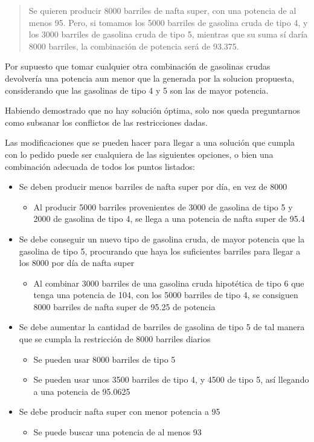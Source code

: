 \documentclass[
]{article}
\providecommand{\tightlist}{%
  \setlength{\itemsep}{0pt}\setlength{\parskip}{0pt}}
\begin{document}
\begin{quote}
Se quieren producir 8000 barriles de nafta super, con una potencia de al
menos 95. Pero, si tomamos los 5000 barriles de gasolina cruda de tipo
4, y los 3000 barriles de gasolina cruda de tipo 5, mientras que su suma
sí daría 8000 barriles, la combinación de potencia será de 93.375.
\end{quote}

Por supuesto que tomar cualquier otra combinación de gasolinas crudas
devolvería una potencia aun menor que la generada por la solucion
propuesta, considerando que las gasolinas de tipo 4 y 5 son las de mayor
potencia.

Habiendo demostrado que no hay solución óptima, solo nos queda
preguntarnos como subsanar los conflictos de las restricciones dadas.

Las modificaciones que se pueden hacer para llegar a una solución que
cumpla con lo pedido puede ser cualquiera de las siguientes opciones, o
bien una combinación adecuada de todos los puntos listados:

\begin{itemize}
\item
  Se deben producir menos barriles de nafta super por día, en vez de
  8000

  \begin{itemize}
  \tightlist
  \item
    Al producir 5000 barriles provenientes de 3000 de gasolina de tipo 5
    y 2000 de gasolina de tipo 4, se llega a una potencia de nafta super
    de 95.4
  \end{itemize}
\item
  Se debe conseguir un nuevo tipo de gasolina cruda, de mayor potencia
  que la gasolina de tipo 5, procurando que haya los suficientes
  barriles para llegar a los 8000 por día de nafta super

  \begin{itemize}
  \tightlist
  \item
    Al combinar 3000 barriles de una gasolina cruda hipotética de tipo 6
    que tenga una potencia de 104, con los 5000 barriles de tipo 4, se
    consiguen 8000 barriles de nafta super de 95.25 de potencia
  \end{itemize}
\item
  Se debe aumentar la cantidad de barriles de gasolina de tipo 5 de tal
  manera que se cumpla la restricción de 8000 barriles diarios

  \begin{itemize}
  \item
    Se pueden usar 8000 barriles de tipo 5
  \item
    Se pueden usar unos 3500 barriles de tipo 4, y 4500 de tipo 5, así
    llegando a una potencia de 95.0625
  \end{itemize}
\item
  Se debe producir nafta super con menor potencia a 95

  \begin{itemize}
  \tightlist
  \item
    Se puede buscar una potencia de al menos 93
  \end{itemize}
\end{itemize}
\end{document}
